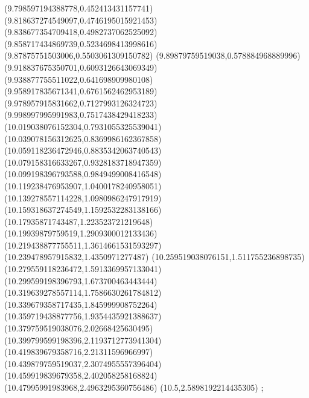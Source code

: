 {(9.798597194388778,0.452413431157741)
(9.818637274549097,0.4746195015921453)
(9.838677354709418,0.4982737062525092)
(9.858717434869739,0.5234698413998616)
(9.87875751503006,0.5503061309150782)
(9.89879759519038,0.578884968889996)
(9.918837675350701,0.6093126643069349)
(9.938877755511022,0.641698909980108)
(9.958917835671341,0.6761562462953189)
(9.978957915831662,0.7127993126324723)
(9.998997995991983,0.7517438429418233)
(10.019038076152304,0.7931055325539041)
(10.039078156312625,0.8369986162367858)
(10.059118236472946,0.8835342063740543)
(10.079158316633267,0.9328183718947359)
(10.099198396793588,0.9849499008416548)
(10.119238476953907,1.0400178240958051)
(10.139278557114228,1.0980986247917919)
(10.159318637274549,1.1592532283138166)
(10.17935871743487,1.223523721219648)
(10.19939879759519,1.2909300012133436)
(10.219438877755511,1.3614661531593297)
(10.239478957915832,1.4350971277487)
(10.259519038076151,1.511755236898735)
(10.279559118236472,1.5913369957133041)
(10.299599198396793,1.673700463443444)
(10.319639278557114,1.7586630261784812)
(10.339679358717435,1.845999908752264)
(10.359719438877756,1.9354435921388637)
(10.379759519038076,2.02668425630495)
(10.399799599198396,2.1193712773941304)
(10.419839679358716,2.21311596966997)
(10.439879759519037,2.3074955557396404)
(10.459919839679358,2.402058258168824)
(10.47995991983968,2.4963295360756486)
(10.5,2.5898192214435305)
};

